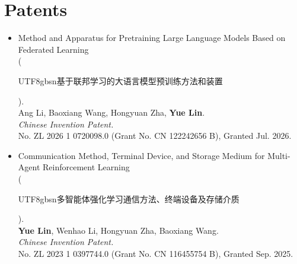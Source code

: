 \documentclass[a4paper,20pt]{article}
\begin{document}




\vspace{5pt}
\section{Patents}
\vspace{3pt}

\begin{itemize}[leftmargin=*, itemsep=0pt, topsep=0pt, partopsep=0pt]

\item Method and Apparatus for Pretraining Large Language Models Based on Federated Learning \\
      (\begin{CJK*}{UTF8}{gbsn}基于联邦学习的大语言模型预训练方法和装置\end{CJK*}). \\
      Ang Li, Baoxiang Wang, Hongyuan Zha, \textbf{Yue Lin}. \\
      \textit{Chinese Invention Patent.} \\
      No. ZL 2026 1 0720098.0 (Grant No. CN 122242656 B), Granted Jul. 2026.

\item Communication Method, Terminal Device, and Storage Medium for Multi-Agent Reinforcement Learning \\
      (\begin{CJK*}{UTF8}{gbsn}多智能体强化学习通信方法、终端设备及存储介质\end{CJK*}). \\
      \textbf{Yue Lin}, Wenhao Li, Hongyuan Zha, Baoxiang Wang. \\
      \textit{Chinese Invention Patent.} \\
      No. ZL 2023 1 0397744.0 (Grant No. CN 116455754 B), Granted Sep. 2025.

\end{itemize}
\end{document}
